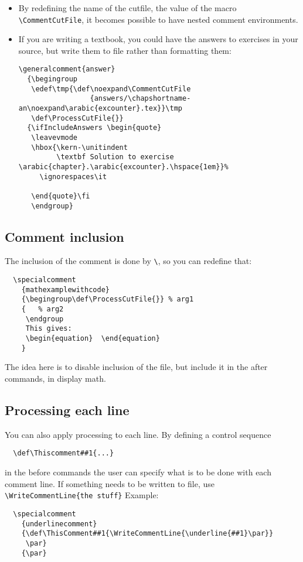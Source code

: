 \documentclass[parskip=false, DIV=8, headings=normal, pagesize=auto]{artikel3}%
\makeatletter
\newcommand*{\cs}[1]{\texttt{\textbackslash#1}}
\newcommand*{\cmd}[1]{\cs{\expandafter\@gobble\string#1}}
\makeatother
\begin{document}
\begin{itemize}
\item By redefining the name of the cutfile, the value of the macro
  \cmd{CommentCutFile}, it becomes possible to have nested comment environments.
\item If you are writing a textbook, you could have the answers to
  exercises in your source, but write them to file rather than
  formatting them:
\begin{verbatim}
\generalcomment{answer}
  {\begingroup
   \edef\tmp{\def\noexpand\CommentCutFile
                 {answers/\chapshortname-an\noexpand\arabic{excounter}.tex}}\tmp
   \def\ProcessCutFile{}}
  {\ifIncludeAnswers \begin{quote}
   \leavevmode
   \hbox{\kern-\unitindent 
         \textbf Solution to exercise \arabic{chapter}.\arabic{excounter}.\hspace{1em}}%
     \ignorespaces\it
   
   \end{quote}\fi
   \endgroup}
\end{verbatim}
\end{itemize}

\subsection{Comment inclusion}

The inclusion of the comment is done
by \cmd{\ProcessCutFile}, so you can redefine that:
\begin{verbatim}
  \specialcomment
    {mathexamplewithcode}
    {\begingroup\def\ProcessCutFile{}} % arg1
    {   % arg2
     \endgroup
     This gives:
     \begin{equation}  \end{equation}
    }
\end{verbatim}
The idea here is to disable inclusion of the file,
but include it in the after commands, in display math.

\subsection{Processing each line}

You can also apply processing to each line.
By defining a control sequence 
\begin{verbatim}
  \def\Thiscomment##1{...}
\end{verbatim}
in the before commands the user can
specify what is to be done with each comment line. If something 
needs to be written to file, use \verb+\WriteCommentLine{the stuff}+
Example:
\begin{verbatim}
  \specialcomment
    {underlinecomment}
    {\def\ThisComment##1{\WriteCommentLine{\underline{##1}\par}}
     \par}
    {\par}
\end{verbatim}
\end{document}
